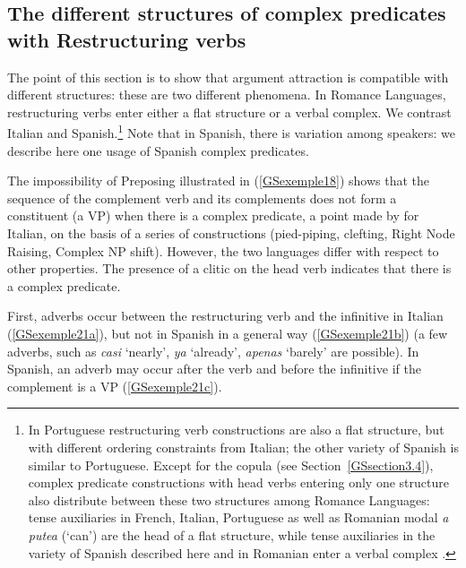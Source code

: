 \documentclass[output=paper
                ,modfonts
                ,nonflat
	        ,collection
	        ,collectionchapter
	        ,collectiontoclongg
 	        ,biblatex
                ,babelshorthands
                ,newtxmath
                ,draftmode
                ,colorlinks, citecolor=brown
]{./langsci/langscibook}
\begin{document}
{\subsection{The different structures of complex predicates with Restructuring verbs} \label{GSsection3.2}

The point of this section is to show that argument attraction is compatible with different structures: these are two different phenomena. In Romance Languages, restructuring verbs enter either a flat structure or a verbal complex. We contrast Italian and Spanish.\footnote{In Portuguese restructuring verb constructions are also a flat structure, but with different ordering constraints from Italian; the other variety of Spanish is similar to Portuguese. Except for the copula (see Section~\ref{GSsection3.4}), complex predicate constructions with head verbs entering only one structure also distribute between these two structures among Romance Languages: tense auxiliaries in French, Italian, Portuguese as well as Romanian modal \textit{a putea} (`can') are the head of a flat structure, while tense auxiliaries in the variety of Spanish described here and in Romanian enter a verbal complex \citep{AG2010}.} Note that in Spanish, there is variation among speakers: we describe here one usage of Spanish complex predicates. 

The impossibility of Preposing illustrated in (\ref{GSexemple18}) shows that the sequence of the complement verb and its complements does not form a constituent (a VP) when there is a complex predicate, a point made by \cite{rizzi1982issues} for Italian, on the basis of a series of constructions (pied-piping, clefting, Right Node Raising, Complex NP shift). However, the two languages differ with respect to other properties. The presence of a clitic on the head verb indicates that there is a complex predicate.
 
First, adverbs occur between the restructuring verb and the infinitive in Italian (\ref{GSexemple21a}), but not in Spanish in a general way (\ref{GSexemple21b}) (a few adverbs, such as \textit{casi} `nearly', \textit{ya} `already', \textit{apenas} `barely' are possible). In Spanish, an adverb may occur after the verb and before the infinitive if the complement is a VP (\ref{GSexemple21c}).

\begin{exe}
	\ex \label{GSexemple21} 
	\begin{xlist}
        \label{GSexemple21a}


\end{xlist}
\end{exe}}
\end{document}
